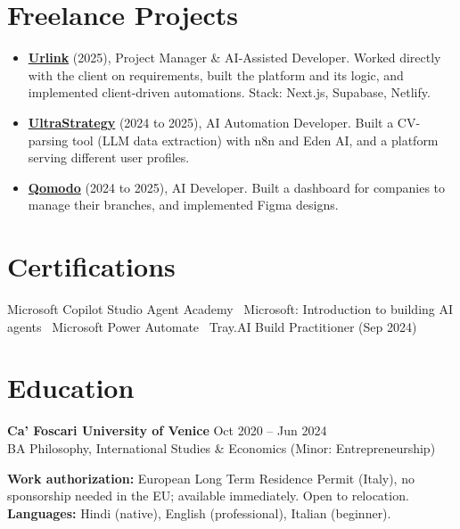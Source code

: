 \documentclass[a4paper,10pt]{article}
\begin{document}
\section{Freelance Projects}
\begin{itemize}
 \item \textbf{\href{https://smarturlink.com/}{Urlink}} (2025), Project Manager \& AI-Assisted Developer. Worked directly with the client on requirements, built the platform and its logic, and implemented client-driven automations. Stack: Next.js, Supabase, Netlify.
 \item \textbf{\href{https://ultrastrategy.com}{UltraStrategy}} (2024 to 2025), AI Automation Developer. Built a CV-parsing tool (LLM data extraction) with n8n and Eden AI, and a platform serving different user profiles.
 \item \textbf{\href{https://www.qomodo.me/}{Qomodo}} (2024 to 2025), AI Developer. Built a dashboard for companies to manage their branches, and implemented Figma designs.
\end{itemize}

\section{Certifications}
Microsoft Copilot Studio Agent Academy \textbullet\ Microsoft: Introduction to building AI agents \textbullet\ Microsoft Power Automate \textbullet\ Tray.AI Build Practitioner (Sep 2024)

\section{Education}
\textbf{Ca' Foscari University of Venice} \hfill Oct 2020 -- Jun 2024\\
BA Philosophy, International Studies \& Economics (Minor: Entrepreneurship)

\vspace{2pt}
{\small \textbf{Work authorization:} European Long Term Residence Permit (Italy), no sponsorship needed in the EU; available immediately. Open to relocation. \quad \textbf{Languages:} Hindi (native), English (professional), Italian (beginner).}
\end{document}

